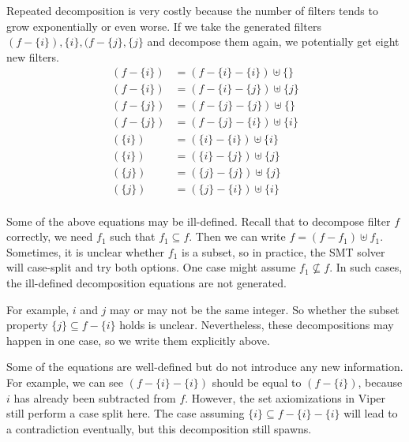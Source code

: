 \documentclass[msc,oneside]{ubcthesis}
\theoremstyle{definition}
\begin{document}
Repeated decomposition is very costly because the number of filters tends to grow exponentially or even worse. If we take the generated filters $(f - \{i\}), \{i\},  ( f - \{j\},  \{j\}$ and decompose them again, we potentially get eight new filters.
\begin{align*} 
\left( f - \{i\}\right) &= 
        \left( f - \{i\} - \{i\}\right) \uplus \{\} \\
\left( f - \{i\}\right) &= 
        \left( f - \{i\} - \{j\}\right) \uplus \{j\} \\
\left( f - \{j\}\right) &= 
        \left( f - \{j\} - \{j\}\right) \uplus \{\} \\
\left( f - \{j\}\right) &= 
        \left( f - \{j\} - \{i\}\right) \uplus \{i\} \\
\left(\{i\}\right) &= 
        \left(\{i\} - \{i\}\right) \uplus \{i\} \\
\left(\{i\}\right) &= 
        \left(\{i\} - \{j\}\right) \uplus \{j\} \\
\left(\{j\}\right) &= 
        \left(\{j\} - \{j\}\right) \uplus \{j\} \\
\left(\{j\}\right) &= 
        \left(\{j\} - \{i\}\right) \uplus \{i\} \\
\end{align*}

Some of the above equations may be ill-defined. Recall that to decompose filter $f$ correctly, we need $f_1$ such that $f_1 \subseteq f$. Then we can write $f = (f - f_1) \uplus f_1.$ Sometimes, it is unclear whether $f_1$ is a subset, so in practice, the SMT solver will case-split and try both options. One case might assume $f_1 \not\subseteq f$. In such cases, the ill-defined decomposition equations are not generated. 

For example, $i$ and $j$ may or may not be the same integer. So whether the subset property $\{j\} \subseteq f - \{i\}$ holds is unclear. Nevertheless, these decompositions may happen in one case, so we write them explicitly above.

Some of the equations are well-defined but do not introduce any new information. For example, we can see $\left( f - \{i\} - \{i\}\right)$ should be equal to $\left( f - \{i\}\right)$, because $i$ has already been subtracted from $f$. However, the set axiomizations in Viper still perform a case split here. The case assuming $\{i\} \subseteq f - \{i\} - \{i\}$ will lead to a contradiction eventually, but this decomposition still spawns. 
\end{document}
